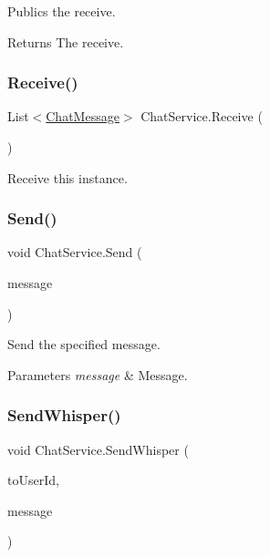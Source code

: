 Publics the receive. 

\begin{DoxyReturn}{Returns}
The receive.
\end{DoxyReturn}
\mbox{\label{class_chat_service_acde6f5c4da12d849ba340cef90ae919a}} 
\subsubsection{\texorpdfstring{Receive()}{Receive()}}
{\footnotesize\ttfamily List$<$\mbox{\hyperlink{class_t_net_1_1_model_1_1_chat_message}{Chat\+Message}}$>$ Chat\+Service.\+Receive (\begin{DoxyParamCaption}{ }\end{DoxyParamCaption})}



Receive this instance. 

\mbox{\label{class_chat_service_a1784ca3c6b4cd656b537d3e76bf48d52}} 
\subsubsection{\texorpdfstring{Send()}{Send()}}
{\footnotesize\ttfamily void Chat\+Service.\+Send (\begin{DoxyParamCaption}\item[{\mbox{\hyperlink{class_t_net_1_1_model_1_1_chat_message}{Chat\+Message}}}]{message }\end{DoxyParamCaption})}



Send the specified message. 


\begin{DoxyParams}{Parameters}
{\em message} & Message.\\
\hline
\end{DoxyParams}
\mbox{\label{class_chat_service_a75d42d36e9f6e4ac6a301b02fb7856ca}} 
\subsubsection{\texorpdfstring{Send\+Whisper()}{SendWhisper()}}
{\footnotesize\ttfamily void Chat\+Service.\+Send\+Whisper (\begin{DoxyParamCaption}\item[{int}]{to\+User\+Id,  }\item[{\mbox{\hyperlink{class_t_net_1_1_model_1_1_chat_message}{Chat\+Message}}}]{message }\end{DoxyParamCaption})}



